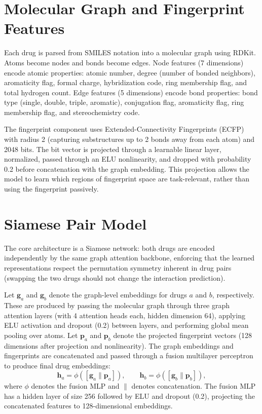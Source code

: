 \documentclass[11pt,a4paper]{report}
\begin{document}
\section{Molecular Graph and Fingerprint Features}
Each drug is parsed from SMILES notation into a molecular graph using RDKit. Atoms become nodes and bonds become edges. Node features (7 dimensions) encode atomic properties: atomic number, degree (number of bonded neighbors), aromaticity flag, formal charge, hybridization code, ring membership flag, and total hydrogen count. Edge features (5 dimensions) encode bond properties: bond type (single, double, triple, aromatic), conjugation flag, aromaticity flag, ring membership flag, and stereochemistry code.

The fingerprint component uses Extended-Connectivity Fingerprints (ECFP) with radius 2 (capturing substructures up to 2 bonds away from each atom) and 2048 bits. The bit vector is projected through a learnable linear layer, normalized, passed through an ELU nonlinearity, and dropped with probability 0.2 before concatenation with the graph embedding. This projection allows the model to learn which regions of fingerprint space are task-relevant, rather than using the fingerprint passively.
\section{Siamese Pair Model}
The core architecture is a Siamese network: both drugs are encoded independently by the same graph attention backbone, enforcing that the learned representations respect the permutation symmetry inherent in drug pairs (swapping the two drugs should not change the interaction prediction).

Let \(\mathbf{g}_a\) and \(\mathbf{g}_b\) denote the graph-level embeddings for drugs \(a\) and \(b\), respectively. These are produced by passing the molecular graph through three graph attention layers (with 4 attention heads each, hidden dimension 64), applying ELU activation and dropout (0.2) between layers, and performing global mean pooling over atoms. Let \(\mathbf{p}_a\) and \(\mathbf{p}_b\) denote the projected fingerprint vectors (128 dimensions after projection and nonlinearity). The graph embeddings and fingerprints are concatenated and passed through a fusion multilayer perceptron to produce final drug embeddings:
\begin{equation}
\mathbf{h}_a = \phi([\mathbf{g}_a \| \mathbf{p}_a]), \qquad
\mathbf{h}_b = \phi([\mathbf{g}_b \| \mathbf{p}_b]),
\end{equation}
where \(\phi\) denotes the fusion MLP and \(\|\) denotes concatenation. The fusion MLP has a hidden layer of size 256 followed by ELU and dropout (0.2), projecting the concatenated features to 128-dimensional embeddings.
\end{document}
